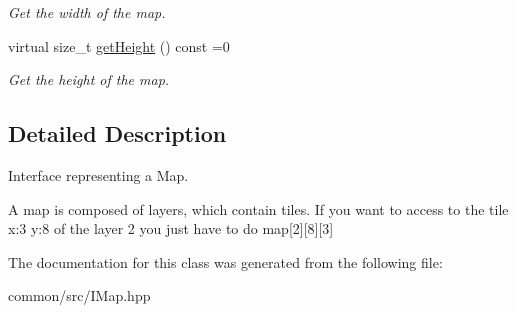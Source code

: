 \begin{DoxyCompactItemize}
\begin{DoxyCompactList}\small\item\em Get the width of the map. \end{DoxyCompactList}\item 
\mbox{\label{classarcade_1_1IMap_a9282ac731fa61b8c18241a309efbd6a0}} 
virtual size\+\_\+t \hyperlink{classarcade_1_1IMap_a9282ac731fa61b8c18241a309efbd6a0}{get\+Height} () const =0
\begin{DoxyCompactList}\small\item\em Get the height of the map. \end{DoxyCompactList}\end{DoxyCompactItemize}


\subsection{Detailed Description}
Interface representing a Map. 

A map is composed of layers, which contain tiles. If you want to access to the tile x\+:3 y\+:8 of the layer 2 you just have to do map\mbox{[}2\mbox{]}\mbox{[}8\mbox{]}\mbox{[}3\mbox{]} 

The documentation for this class was generated from the following file\+:\begin{DoxyCompactItemize}
\item 
common/src/I\+Map.\+hpp\end{DoxyCompactItemize}
